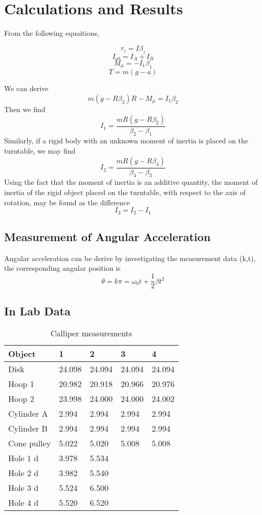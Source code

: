 \section{Calculations and Results}
From the following equaitions,

$$ \tau_z = I\beta_z $$
$$ I_{ab} = I_A + I_B $$
$$ M_\mu = -I_1\beta_1 $$
$$ T = m(g-a)$$

We can derive
$$ m(g-R\beta_2)R-M_\mu=I_1\beta_2 $$
Then we find
$$ I_1=\frac{mR(g-R\beta_2)}{\beta_2-\beta_1} $$
Similarly, if a rigid body with an unknown moment of inertia is placed on the
turntable, we may find 
$$ I_2=\frac{mR(g-R\beta_4)}{\beta_4-\beta_3} $$
Using the fact that the moment of inertia is an additive quantity, the moment of
inertia of the rigid object placed on the turntable, with respect to the axis of
rotation, may be found as the difference 
$$ I_3 = I_2 - I_1 $$

\subsection{Measurement of Angular Acceleration}
Angular acceleration can be derive by investigating the measurement data (k,t),
the corresponding angular position is
$$ \theta = k\pi = \omega_0 t + \frac{1}{2}\beta t^2 $$


\subsection{In Lab Data}

\begin{table}[H]
  \centering
  \begin{tabular}{|l|l|l|l|l|}
    \hline
    Object & 1 & 2 & 3 & 4 \\
    \hline
    Disk & 24.098 & 24.094 & 24.094 & 24.094 \\
    Hoop 1 & 20.982 & 20.918 & 20.966 & 20.976 \\
    Hoop 2 & 23.998 & 24.000 & 24.000 & 24.002 \\
    Cylinder A & 2.994 & 2.994 & 2.994 & 2.994 \\
    Cylinder B & 2.994 & 2.994 & 2.994 & 2.994 \\
    Cone pulley & 5.022 & 5.020 & 5.008 & 5.008 \\
    Hole 1 d & 3.978 & 5.534 & & \\
    Hole 2 d & 3.982 & 5.540 & & \\
    Hole 3 d & 5.524 & 6.500 & & \\
    Hole 4 d & 5.520 & 6.520 & & \\
    \hline
  \end{tabular}
  \caption{Calliper measurements}
  \end{table}


